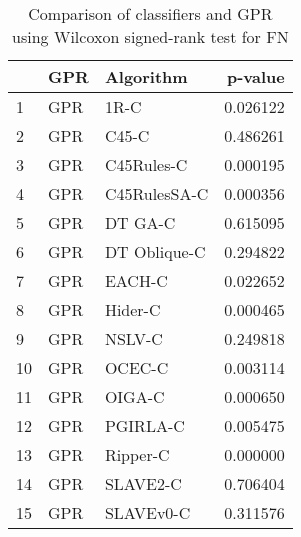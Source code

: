\begin{table}
\footnotesize
\caption{Comparison of classifiers and GPR using Wilcoxon signed-rank test for FN}
\label{tab:GPR wilcoxon FN comparison}
\begin{tabular}{lllr}
\hline
 & GPR & Algorithm & p-value \\
\hline
1 & GPR & 1R-C & 0.026122 \\
2 & GPR & C45-C & 0.486261 \\
3 & GPR & C45Rules-C & 0.000195 \\
4 & GPR & C45RulesSA-C & 0.000356 \\
5 & GPR & DT GA-C & 0.615095 \\
6 & GPR & DT Oblique-C & 0.294822 \\
7 & GPR & EACH-C & 0.022652 \\
8 & GPR & Hider-C & 0.000465 \\
9 & GPR & NSLV-C & 0.249818 \\
10 & GPR & OCEC-C & 0.003114 \\
11 & GPR & OIGA-C & 0.000650 \\
12 & GPR & PGIRLA-C & 0.005475 \\
13 & GPR & Ripper-C & 0.000000 \\
14 & GPR & SLAVE2-C & 0.706404 \\
15 & GPR & SLAVEv0-C & 0.311576 \\
\hline
\end{tabular}
\end{table}
